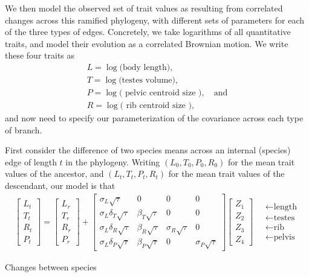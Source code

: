 \documentclass{article}
\begin{document}
We then model the observed set of trait values as resulting from correlated changes across this ramified phylogeny,
with different sets of parameters for each of the three types of edges.
Concretely, we take logarithms of all quantitative traits,
and model their evolution as a correlated Brownian motion.
We write these four traits as
\begin{align}
    L = \log \text{(body length)}, \\
    T = \log \text{(testes volume)}, \\
    P = \log \text{( pelvic centroid size )}, \quad \text{and} \\
    R = \log \text{( rib centroid size )},
\end{align}
and now need to specify our parameterization of the covariance across each type of branch.

First consider the difference of two species means across an internal (species) edge of length $t$ in the phylogeny.
Writing $(L_0,T_0,P_0,R_0)$ for the mean trait values of the ancestor,
and $(L_t,T_t,P_t,R_t)$ for the mean trait values of the descendant,
our model is that
\begin{align}
\begin{bmatrix}
    L_t \\ T_t \\ R_t \\ P_t 
\end{bmatrix}
=
\begin{bmatrix}
    L_r \\ T_r \\ R_r \\ P_r 
\end{bmatrix}
+
\begin{bmatrix}
    \sigma_L \sqrt{\tau} &  0  & 0  & 0  \\
    \sigma_L \delta_T \sqrt{\tau}  &  \beta_T \sqrt{\tau}  & 0  &   0 \\
    \sigma_L \delta_R \sqrt{\tau}  &  \beta_R \sqrt{\tau}  & \sigma_R \sqrt{\tau}  &   0 \\
    \sigma_L \delta_P \sqrt{\tau}  &  \beta_P \sqrt{\tau}  & 0  &   \sigma_P\sqrt{\tau}  
\end{bmatrix}
\begin{bmatrix}
    Z_1 \\ Z_2 \\ Z_3 \\ Z_4
\end{bmatrix}
\quad \begin{matrix}
    \leftarrow \text{length} \\
    \leftarrow \text{testes} \\
    \leftarrow \text{rib} \\
    \leftarrow \text{pelvis} 
\end{matrix}
\end{align}


Changes between species
\end{document}
